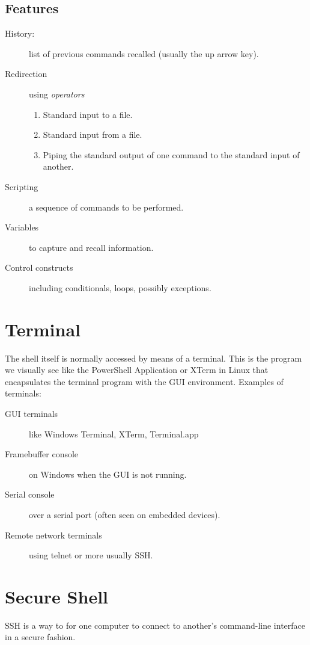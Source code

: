 \documentclass[slides]{pgnotes}
\begin{document}
\subsection{Features}

\begin{description}
\item[History:] list of previous commands recalled (usually the up arrow key).
\item[Redirection] using \textit{operators}
  \begin{enumerate}
  \item Standard input to a file.
  \item Standard input from a file.
  \item Piping the standard output of one command to the standard input of another.
  \end{enumerate}
\item[Scripting] a sequence of commands to be performed.
\item[Variables] to capture and recall information.
\item[Control constructs] including conditionals, loops, possibly exceptions.
\end{description}

\section{Terminal}

The shell itself is normally accessed by means of a terminal.
This is the program we visually see like the PowerShell Application or XTerm in Linux that encapsulates the terminal program with the GUI environment.
Examples of terminals:

\begin{description}
\item[GUI terminals ] like Windows Terminal, XTerm, Terminal.app
\item[Framebuffer console] on Windows when the GUI is not running.
\item[Serial console] over a serial port (often seen on embedded devices).
\item[Remote network terminals] using telnet or more usually SSH.
\end{description}

\section{Secure Shell}

SSH is a way to for one computer to connect to another's command-line interface in a secure fashion.
\end{document}
